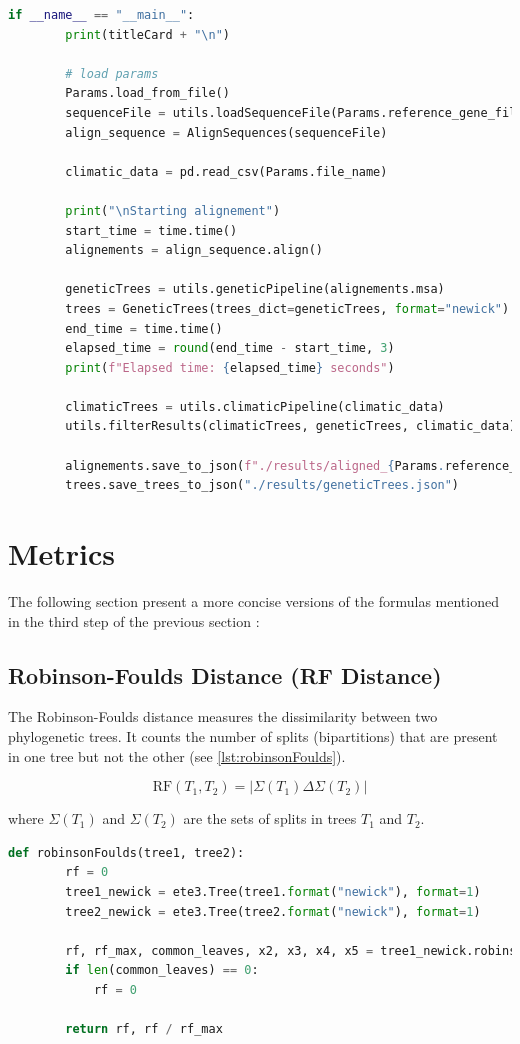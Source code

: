 \begin{lstlisting}[label=lst:main,language=Python,caption=aPhyloGeo’s main function]
    if __name__ == "__main__":
        print(titleCard + "\n")

        # load params 
        Params.load_from_file()
        sequenceFile = utils.loadSequenceFile(Params.reference_gene_filepath)
        align_sequence = AlignSequences(sequenceFile)

        climatic_data = pd.read_csv(Params.file_name)

        print("\nStarting alignement")
        start_time = time.time()
        alignements = align_sequence.align()

        geneticTrees = utils.geneticPipeline(alignements.msa)
        trees = GeneticTrees(trees_dict=geneticTrees, format="newick")
        end_time = time.time()
        elapsed_time = round(end_time - start_time, 3)
        print(f"Elapsed time: {elapsed_time} seconds")

        climaticTrees = utils.climaticPipeline(climatic_data)
        utils.filterResults(climaticTrees, geneticTrees, climatic_data)

        alignements.save_to_json(f"./results/aligned_{Params.reference_gene_file}.json")
        trees.save_trees_to_json("./results/geneticTrees.json")
\end{lstlisting}

\section{Metrics}\label{metrics}
The following section present a more concise versions of the formulas mentioned in the third step of the previous section :

\subsection{Robinson-Foulds Distance (RF Distance)}\label{RF}
The Robinson-Foulds distance measures the dissimilarity between two phylogenetic trees. It counts the number of splits (bipartitions) that are present in one tree but not the other (see \autoref{lst:robinsonFoulds}).

\[ \text{RF}(T_1, T_2) = | \Sigma(T_1) \Delta \Sigma(T_2) | \]

where \( \Sigma(T_1) \) and \( \Sigma(T_2) \) are the sets of splits in trees \( T_1 \) and \( T_2 \).

\begin{lstlisting}[label=lst:robinsonFoulds,language=Python,caption=Python script for calculating the Robinson-Foulds distance using the ete3 package in aPhyloGeo package]
    def robinsonFoulds(tree1, tree2):
        rf = 0
        tree1_newick = ete3.Tree(tree1.format("newick"), format=1)
        tree2_newick = ete3.Tree(tree2.format("newick"), format=1)

        rf, rf_max, common_leaves, x2, x3, x4, x5 = tree1_newick.robinson_foulds(tree2_newick, unrooted_trees=True)
        if len(common_leaves) == 0:
            rf = 0

        return rf, rf / rf_max
\end{lstlisting}


